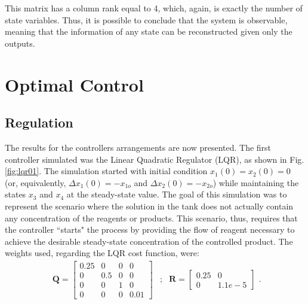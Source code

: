 \documentclass[a4paper,11pt]{book}
\numberwithin{figure}{chapter}
\numberwithin{equation}{chapter}
\numberwithin{table}{chapter}
\theoremstyle{definition}
\begin{document}
\noindent This matrix has a column rank equal to 4, which, again, is exactly the number of state variables. Thus, it is possible to conclude that the system is observable, meaning that the information of any state can be reconstructed given only the outputs. 

\section{Optimal Control}

\subsection{Regulation}

The results for the controllers arrangements are now presented. The first controller simulated was the Linear Quadratic Regulator (LQR), as shown in Fig. \ref{fig:lqr01}. The simulation started with initial condition $x_1(0) = x_2(0) = 0$ (or, equivalently, $\Delta x_1(0) = -x_{1o}$ and $\Delta x_2(0) = -x_{2o}$) while maintaining the states $x_3$ and $x_4$ at the steady-state value. The goal of this simulation was to represent the scenario where the solution in the tank does not actually contain any concentration of the reagents or products. This scenario, thus, requires that the controller ``starts" the process by providing the flow of reagent necessary to achieve the desirable steady-state concentration of the controlled product. The weights used, regarding the LQR cost function, were: 
\begin{equation} \label{eq:exp01}
\begin{matrix}
   \bm{Q} = \begin{bmatrix} 0.25 & 0 & 0 & 0 \\ 0 & 0.5 & 0 & 0 \\ 0 & 0 & 1 & 0\\ 0 & 0 & 0 & 0.01 \end{bmatrix} &; & \bm{R} = \begin{bmatrix} 0.25 & 0 \\ 0 & 1.1e-5 \end{bmatrix}
\end{matrix}
.\end{equation} 
\end{document}
